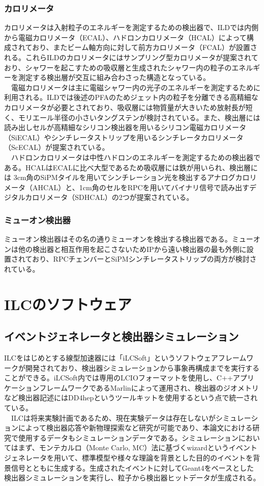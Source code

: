 \subsubsection{カロリメータ}
カロリメータは入射粒子のエネルギーを測定するための検出器で、ILDでは内側から電磁カロリメータ（ECAL）、ハドロンカロリメータ（HCAL）によって構成されており、またビーム軸方向に対して前方カロリメータ（FCAL）が設置される。これらILDのカロリメータにはサンプリング型カロリメータが提案されており、シャワーを起こすための吸収層と生成されたシャワー内の粒子のエネルギーを測定する検出層が交互に組み合わさった構造となっている。\\
　電磁カロリメータは主に電磁シャワー内の光子のエネルギーを測定するために利用される。ILDでは後述のPFAのためジェット内の粒子を分離できる高精細なカロリメータが必要とされており、吸収層には物質量が大きいため放射長が短く、モリエール半径の小さいタングステンが検討されている。また、検出層には読み出しセルが高精細なシリコン検出器を用いるシリコン電磁カロリメータ（SiECAL）やシンチレータストリップを用いるシンチレータカロリメータ（ScECAL）が提案されている。\\
　ハドロンカロリメータは中性ハドロンのエネルギーを測定するための検出器である。HCALはECALに比べ大型であるため吸収層には鉄が用いられ、検出層には 3cm角のSiPMタイルを用いてシンチレーション光を検出するアナログカロリメータ（AHCAL）と、1cm角のセルをRPCを用いてバイナリ信号で読み出すデジタルカロリメータ（SDHCAL）の2つが提案されている。
\subsubsection{ミューオン検出器}
ミューオン検出器はその名の通りミューオンを検出する検出器である。ミューオンは他の検出器と相互作用を起こさないためIPから遠い検出器の最も外側に設置されており、RPCチェンバーとSiPMシンチレータストリップの両方が検討されている。

\section{ILCのソフトウェア}
\subsection{イベントジェネレータと検出器シミュレーション}
ILCをはじめとする線型加速器には「iLCSoft」というソフトウェアフレームワークが開発されており、検出器シミュレーションから事象再構成までを実行することができる。iLCSoft内では専用のLCIOフォーマットを使用し、C++アプリケーションフレームワークであるMarlinによって運用され、検出器のジオメトリなど検出器記述にはDD4hepというツールキットを使用するという点で統一されている。\\
　ILCは将来実験計画であるため、現在実験データは存在しないがシミュレーションによって検出器応答や新物理探索など研究が可能であり、本論文における研究で使用するデータもシミュレーションデータである。シミュレーションにおいてはまず、モンテカルロ（Monte Carlo, MC）法に基づくwizardというイベントジェネレータを用いて、標準模型や様々な理論を背景とした目的のイベントを背景信号とともに生成する。生成されたイベントに対してGeant4をベースとした検出器シミュレーションを実行し、粒子から検出器ヒットデータが生成される。
